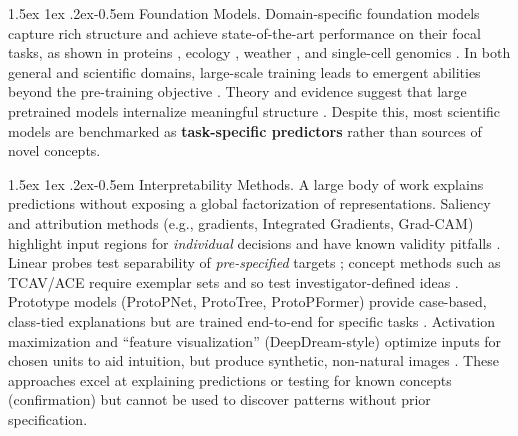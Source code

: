 \documentclass[10pt,twocolumn,letterpaper]{article}
\makeatletter
\renewcommand{\paragraph}{%
  \@startsection{paragraph}{4}%
  {\z@}{1.5ex \@plus 1ex \@minus .2ex}{-0.5em}%
  {\normalfont\normalsize\bfseries}%
}
\makeatother
\begin{document}
\paragraph{Foundation Models.}
Domain-specific foundation models capture rich structure and achieve state-of-the-art performance on their focal tasks, as shown in proteins \citep{abramson2024alphafold3,hayes2025esm3}, ecology \citep{stevens2024bioclip}, weather \citep{lam2023graphcast,price2025gencast}, and single-cell genomics \citep{cui2024scgpt}.
In both general and scientific domains, large-scale training leads to emergent abilities beyond the pre-training objective \citep{wei2022emergent,gu2025bioclip2}.
Theory and evidence suggest that large pretrained models internalize meaningful structure \citep{ha2018world,caron2021dinov1,lecun2022jepa,huh2024platonic}.
Despite this, most scientific models are benchmarked as \textbf{task-specific predictors} rather than sources of novel concepts.

\paragraph{Interpretability Methods.}
A large body of work explains predictions without exposing a global factorization of representations.
Saliency and attribution methods (e.g., gradients, Integrated Gradients, Grad-CAM) highlight input regions for \emph{individual} decisions and have known validity pitfalls \citep{simonyan2013deep,sundararajan2017axiomatic,selvaraju2017gradcam,adebayo2018sanity}.
Linear probes test separability of \emph{pre-specified} targets \citep{alain2016understanding,hewitt2019probes}; concept methods such as TCAV/ACE require exemplar sets and so test investigator-defined ideas \citep{kim2018tcav,ghorbani2019ace}.
Prototype models (ProtoPNet, ProtoTree, ProtoPFormer) provide case-based, class-tied explanations but are trained end-to-end for specific tasks \citep{chen2019protopnet,nauta2021prototree,xue2022protopformer}.
Activation maximization and “feature visualization” (DeepDream-style) optimize inputs for chosen units to aid intuition, but produce synthetic, non-natural images \citep{mahendran2016visualizing,nguyen2016dgn,olah2017feature}.
These approaches excel at explaining predictions or testing for known concepts (confirmation) but cannot be used to discover patterns without prior specification.
\end{document}
